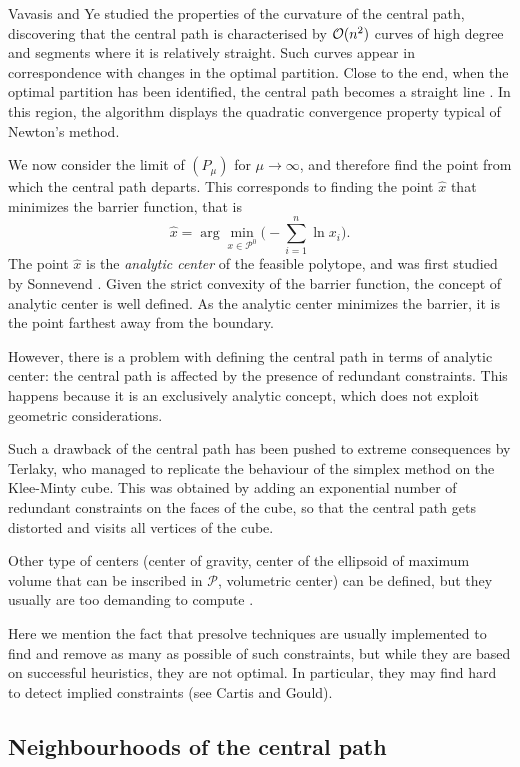 Vavasis and Ye \cite{VavasisYe} studied the properties of the 
curvature of the central path, discovering that the central path
is characterised by $\mathcal{O}(n^2)$ curves of high degree and
segments where it is relatively straight.
Such curves appear in correspondence with changes in the optimal
partition.
Close to the end, when the optimal partition has been identified,
the central path becomes a straight line \cite{Megiddo}.
In this region, the algorithm displays the quadratic convergence 
property typical of Newton's method.

We now consider
the limit of $(P_\mu)$ for $\mu \to \infty$, and therefore
find the point from which the central path departs.
This corresponds to finding the point $\hat{x}$ 
that minimizes the barrier function, that is
\[
  \hat{x} = \arg \min_{x \in \mathcal{P}^0} \big(-\sum_{i=1}^n \ln x_i \big).
\]
The point $\hat{x}$ is the {\em analytic center} of the feasible polytope, 
and was first studied by Sonnevend \cite{Sonnevend86}.
Given the strict convexity of the barrier function, the concept 
of analytic center is well defined.
As the analytic center minimizes the barrier, it
is the point farthest away from the boundary.

However, there is a problem with defining the central path in terms
of analytic center: the central path is affected by the presence of 
redundant constraints. 
This happens because it is an exclusively analytic concept, which does
not exploit geometric considerations.

Such a drawback of the central path has been pushed to extreme
consequences by Terlaky,
who managed to replicate the behaviour of the simplex method
on the Klee-Minty cube. This was obtained by adding an exponential
number of redundant constraints on the faces of the cube, so
that the central path gets distorted and visits all vertices
of the cube.

Other type of centers (center of gravity, center of the ellipsoid of 
maximum volume that can be inscribed in $\mathcal{P}$, volumetric center) 
can be defined, but they usually are too demanding to compute 
\cite{Gonzaga92}. 

Here we mention the fact that presolve
techniques are usually implemented to find and remove as many as
possible of such constraints, but while they are based on successful
heuristics, they are not optimal. In particular, they may find hard
to detect implied constraints (see Cartis and Gould).

%
%
\subsection{Neighbourhoods of the central path}
\label{sec:Neighbourhoods}

